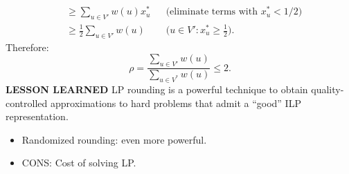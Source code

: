 \begin{align*}
&\geq\sum_{u\in V'}w(u)x_u^*&&\text{(eliminate terms with $x_u^*<1/2$)}\\
&\geq\frac12\sum_{u\in V'}w(u)&&\text{($u\in V':x_u^*\geq\tfrac12$).}
\end{align*}
Therefore:
\[\rho=\frac{\sum_{u\in V'}w(u)}{\sum_{u\in V^*}w(u)}\leq2.\]
\textbf{LESSON LEARNED} LP rounding is a powerful technique to obtain quality-controlled approximations to hard problems that admit a ``good'' ILP representation.
\begin{itemize}
\item Randomized rounding: even more powerful.
\item CONS: Cost of solving LP.
\end{itemize}
